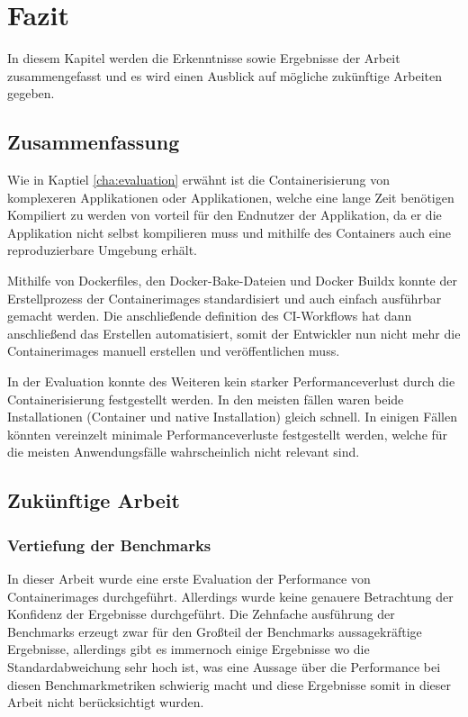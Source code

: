 \chapter{Fazit} \label{cha:conclusion}

In diesem Kapitel werden die Erkenntnisse sowie Ergebnisse der Arbeit zusammengefasst und es wird einen Ausblick auf mögliche zukünftige Arbeiten gegeben. 

\section{Zusammenfassung}

Wie in Kaptiel \cref{cha:evaluation} erwähnt ist die Containerisierung von komplexeren Applikationen oder Applikationen, welche eine lange Zeit benötigen Kompiliert zu werden von vorteil für den Endnutzer der Applikation, da er die Applikation nicht selbst kompilieren muss und mithilfe des Containers auch eine reproduzierbare Umgebung erhält. 

Mithilfe von Dockerfiles, den Docker-Bake-Dateien und Docker Buildx konnte der Erstellprozess der Containerimages standardisiert und auch einfach ausführbar gemacht werden. Die anschließende definition des CI-Workflows hat dann anschließend das Erstellen automatisiert, somit der Entwickler nun nicht mehr die Containerimages manuell erstellen und veröffentlichen muss. 

In der Evaluation konnte des Weiteren kein starker Performanceverlust durch die Containerisierung festgestellt werden. In den meisten fällen waren beide Installationen (Container und native Installation) gleich schnell. In einigen Fällen könnten vereinzelt minimale Performanceverluste festgestellt werden, welche für die meisten Anwendungsfälle wahrscheinlich nicht relevant sind.      

\section{Zukünftige Arbeit}

\subsection{Vertiefung der Benchmarks}

In dieser Arbeit wurde eine erste Evaluation der Performance von Containerimages durchgeführt. Allerdings wurde keine genauere Betrachtung der Konfidenz der Ergebnisse durchgeführt. Die Zehnfache ausführung der Benchmarks erzeugt zwar für den Großteil der Benchmarks aussagekräftige Ergebnisse, allerdings gibt es immernoch einige Ergebnisse wo die Standardabweichung sehr hoch ist, was eine Aussage über die Performance bei diesen Benchmarkmetriken schwierig macht und diese Ergebnisse somit in dieser Arbeit nicht berücksichtigt wurden.

